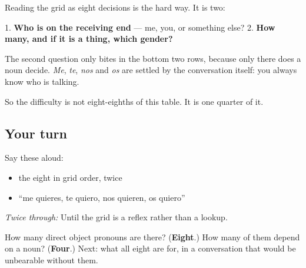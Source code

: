 \begin{grammarlens}[title={Grammar Lens: two questions}]
Reading the grid as eight decisions is the hard way. It is two:

1. \textbf{Who is on the receiving end} — me, you, or something else? 2. \textbf{How many, and if it is a thing, which gender?}

The second question only bites in the bottom two rows, because only there does a noun decide. \emph{Me}, \emph{te}, \emph{nos} and \emph{os} are settled by the conversation itself: you always know who is talking.

So the difficulty is not eight-eighths of this table. It is one quarter of it.
\end{grammarlens}

\subsection*{Your turn}
Say these aloud:

\begin{itemize}
\raggedright
  \item the eight in grid order, twice
  \item \textquotedblleft{}me quieres, te quiero, nos quieren, os quiero\textquotedblright{}
\end{itemize}

\emph{Twice through:} Until the grid is a reflex rather than a lookup.

\begin{tcolorbox}[breakable,colback=teal!4,colframe=teal!35!black,title={Before you move on}]
How many direct object pronouns are there? (\textbf{Eight}.) How many of them depend on a noun? (\textbf{Four}.) Next: what all eight are for, in a conversation that would be unbearable without them.
\end{tcolorbox}
